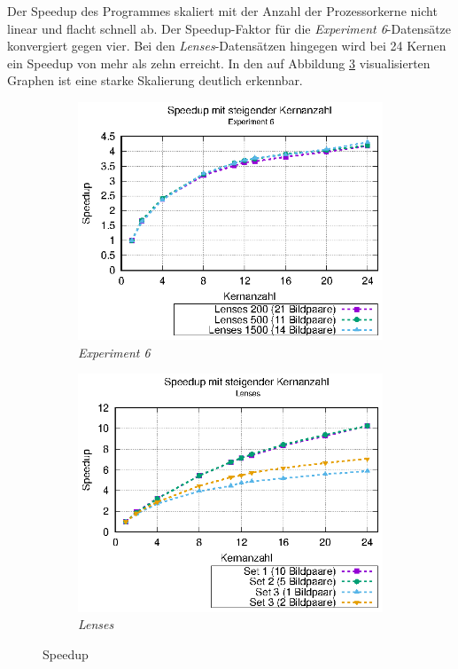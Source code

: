 Der Speedup des Programmes skaliert mit der Anzahl der Prozessorkerne nicht linear und flacht schnell ab. Der Speedup-Faktor für die \textit{Experiment 6}-Datensätze konvergiert gegen vier. Bei den \textit{Lenses}-Da\-ten\-sä\-tzen hingegen wird bei 24 Kernen ein Speedup von mehr als zehn erreicht. In den auf Abbildung \ref{fig:speedup} visualisierten Graphen ist eine starke Skalierung deutlich erkennbar. 

\begin{center}
	\begin{figure}
		\begin{subfigure}[b]{0.49\textwidth}
			\centering
			\includegraphics[width=\textwidth]{pdf/speedup_exp6}
			\caption{\textit{Experiment 6}}
			\label{fig:speedup_exp6}
		\end{subfigure}
		\hfill
		\begin{subfigure}[b]{0.49\textwidth}
			\centering
			\includegraphics[width=\textwidth]{pdf/speedup_lenses}
			\caption{\textit{Lenses}}
			\label{fig:speedup_lenses}
		\end{subfigure}
		\caption{Speedup}
		\label{fig:speedup}
	\end{figure}
\end{center}

